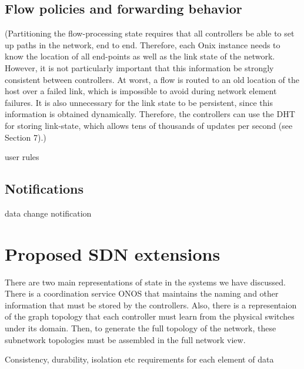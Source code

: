 \documentclass[letterpaper,twocolumn,10pt]{article}
\begin{document}
\subsection*{Flow policies and forwarding behavior}

(Partitioning the flow-processing state requires that all controllers be able to set up paths in the network, end to end. Therefore, each Onix instance needs to know the location of all end-points as well as the link state of the network. However, it is not particularly important that this information be strongly consistent between controllers. At worst, a flow is routed to an old location of the host over a failed link, which is impossible to avoid during network element failures.
It is also unnecessary for the link state to be persistent, since this information is obtained dynamically. Therefore, the controllers can use the DHT for storing link-state, which allows tens of thousands of updates per second (see Section 7).)

user rules

\subsection*{Notifications}
data change notification
  

\section{Proposed SDN extensions}

There are two main representations of state in the systems we have discussed. There is a coordination service ONOS that maintains the naming and other information that must be stored by the controllers. Also, there is a representaion of the graph topology that each controller must learn from the physical switches under its domain. Then, to generate the full topology of the network, these subnetwork topologies must be assembled in the full network view.

Consistency, durability, isolation etc requirements for each element of data
\end{document}
